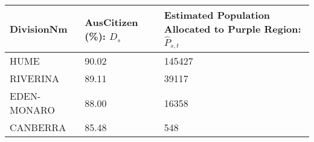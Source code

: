 \documentclass[openany]{book}
\begin{document}
\begin{longtable}[]{@{}lll@{}}
\toprule
\begin{minipage}[b]{0.18\columnwidth}\raggedright
DivisionNm\strut
\end{minipage} & \begin{minipage}[b]{0.21\columnwidth}\raggedright
AusCitizen (\%): \(D_s\)\strut
\end{minipage} & \begin{minipage}[b]{0.53\columnwidth}\raggedright
Estimated Population Allocated to Purple Region: \(\hat{P}_{s,t}\)\strut
\end{minipage}\tabularnewline
\midrule
\endhead
\begin{minipage}[t]{0.18\columnwidth}\raggedright
HUME\strut
\end{minipage} & \begin{minipage}[t]{0.21\columnwidth}\raggedright
90.02\strut
\end{minipage} & \begin{minipage}[t]{0.53\columnwidth}\raggedright
145427\strut
\end{minipage}\tabularnewline
\begin{minipage}[t]{0.18\columnwidth}\raggedright
RIVERINA\strut
\end{minipage} & \begin{minipage}[t]{0.21\columnwidth}\raggedright
89.11\strut
\end{minipage} & \begin{minipage}[t]{0.53\columnwidth}\raggedright
39117\strut
\end{minipage}\tabularnewline
\begin{minipage}[t]{0.18\columnwidth}\raggedright
EDEN-MONARO\strut
\end{minipage} & \begin{minipage}[t]{0.21\columnwidth}\raggedright
88.00\strut
\end{minipage} & \begin{minipage}[t]{0.53\columnwidth}\raggedright
16358\strut
\end{minipage}\tabularnewline
\begin{minipage}[t]{0.18\columnwidth}\raggedright
CANBERRA\strut
\end{minipage} & \begin{minipage}[t]{0.21\columnwidth}\raggedright
85.48\strut
\end{minipage} & \begin{minipage}[t]{0.53\columnwidth}\raggedright
548\strut
\end{minipage}\tabularnewline

\end{longtable}
\end{document}
